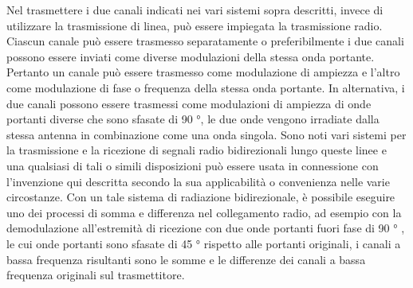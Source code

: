 \documentclass[11pt]{article}
\begin{document}
\begin{multicols*}{2}
Nel trasmettere i due canali indicati nei vari sistemi sopra descritti, invece di utilizzare la trasmissione di linea, può essere impiegata la trasmissione radio. Ciascun canale può essere trasmesso separatamente o preferibilmente i due canali possono essere inviati come diverse modulazioni della stessa onda portante. Pertanto un canale può essere trasmesso come modulazione di ampiezza e l'altro come modulazione di fase o frequenza della stessa onda portante. In alternativa, i due canali possono essere trasmessi come modulazioni di ampiezza di onde portanti diverse che sono sfasate di 90 °, le due onde vengono irradiate dalla stessa antenna in combinazione come una onda singola. Sono noti vari sistemi per la trasmissione e la ricezione di segnali radio bidirezionali lungo queste linee e una qualsiasi di tali o simili disposizioni può essere usata in connessione con l'invenzione qui descritta secondo la sua applicabilità o convenienza nelle varie circostanze. Con un tale sistema di radiazione bidirezionale, è possibile eseguire uno dei processi di somma e differenza nel collegamento radio, ad esempio con la demodulazione all'estremità di ricezione con due onde portanti fuori fase di 90 ° , le cui onde portanti sono sfasate di 45 ° rispetto alle portanti originali, i canali a bassa frequenza risultanti sono le somme e le differenze dei canali a bassa frequenza originali sul trasmettitore.
 

\end{multicols*}
\end{document}

